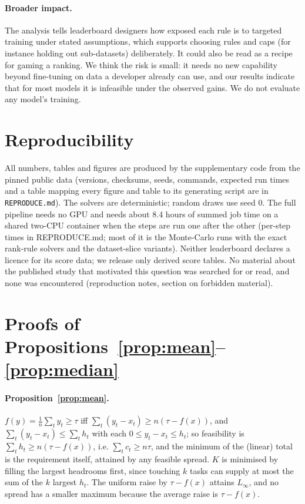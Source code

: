 \documentclass{article}
\begin{document}
\paragraph{Broader impact.}
The analysis tells leaderboard designers how exposed each rule is to targeted training under stated assumptions, which supports choosing rules and caps (for instance holding out sub-datasets) deliberately. It could also be read as a recipe for gaming a ranking. We think the risk is small: it needs no new capability beyond fine-tuning on data a developer already can use, and our results indicate that for most models it is infeasible under the observed gains. We do not evaluate any model's training.

\section{Reproducibility}
\label{sec:repro}
All numbers, tables and figures are produced by the supplementary code from the pinned public data (versions, checksums, seeds, commands, expected run times and a table mapping every figure and table to its generating script are in \texttt{REPRODUCE.md}). The solvers are deterministic; random draws use seed 0. The full pipeline needs no GPU and needs about 8.4 hours of summed job time on a shared two-CPU container when the steps are run one after the other (per-step times in REPRODUCE.md; most of it is the Monte-Carlo runs with the exact rank-rule solvers and the dataset-slice variants). Neither leaderboard declares a licence for its score data; we release only derived score tables. No material about the published study that motivated this question was searched for or read, and none was encountered (reproduction notes, section on forbidden material).





\appendix
\section{Proofs of Propositions~\ref{prop:mean}--\ref{prop:median}}
\label{app:proofs}
\paragraph{Proposition~\ref{prop:mean}.} $f(y)=\frac1n\sum_t y_t\ge\tau$ iff $\sum_t(y_t-x_t)\ge n(\tau-f(x))$, and $\sum_t(y_t-x_t)\le\sum_t h_t$ with each $0\le y_t-x_t\le h_t$; so feasibility is $\sum_t h_t\ge n(\tau-f(x))$, i.e. $\sum_t c_t\ge n\tau$, and the minimum of the (linear) total is the requirement itself, attained by any feasible spread. $K$ is minimised by filling the largest headrooms first, since touching $k$ tasks can supply at most the sum of the $k$ largest $h_t$. The uniform raise by $\tau-f(x)$ attains $L_\infty$, and no spread has a smaller maximum because the average raise is $\tau-f(x)$.
\end{document}
